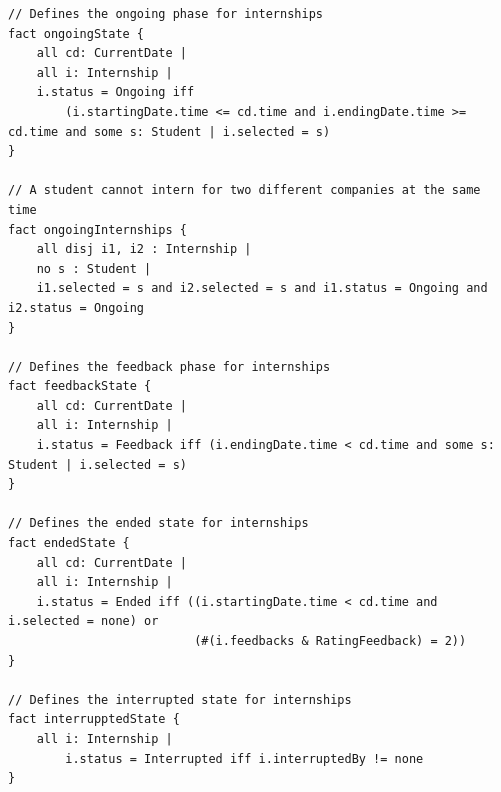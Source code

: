 \documentclass{article}
\begin{document}
\begin{lstlisting}
// Defines the ongoing phase for internships
fact ongoingState {
    all cd: CurrentDate |
    all i: Internship |
    i.status = Ongoing iff 
        (i.startingDate.time <= cd.time and i.endingDate.time >= cd.time and some s: Student | i.selected = s)
}

// A student cannot intern for two different companies at the same time
fact ongoingInternships {
    all disj i1, i2 : Internship |
    no s : Student | 
    i1.selected = s and i2.selected = s and i1.status = Ongoing and i2.status = Ongoing
}

// Defines the feedback phase for internships
fact feedbackState {
    all cd: CurrentDate |
    all i: Internship |
    i.status = Feedback iff (i.endingDate.time < cd.time and some s: Student | i.selected = s)
}

// Defines the ended state for internships
fact endedState {
    all cd: CurrentDate |
    all i: Internship | 
    i.status = Ended iff ((i.startingDate.time < cd.time and i.selected = none) or 
                          (#(i.feedbacks & RatingFeedback) = 2))
}

// Defines the interrupted state for internships
fact interrupptedState {
    all i: Internship | 
        i.status = Interrupted iff i.interruptedBy != none 
}
\end{lstlisting}
\end{document}
